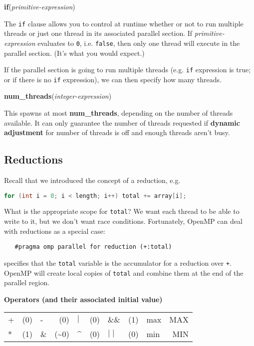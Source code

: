   \begin{center}
    {\bf if}({\it primitive-expression})    
  \end{center}
The {\tt if} clause allows you to control at runtime whether or not to run
multiple threads or just one thread in its associated parallel section.
If {\it primitive-expression} evaluates to {\tt 0}, i.e. {\tt false}, then
only one thread will execute in the parallel section. (It's what you would expect.)


If the parallel section is going to run multiple threads (e.g. {\tt if} expression
is true; or if there is no {\tt if} expression), we can then specify how many threads.
  \begin{center}
    {\bf num\_threads}({\it integer-expression})    
  \end{center}

This spawns at most {\bf num\_threads}, depending on the number of
threads available.  It can only guarantee the number of threads
requested if {\bf dynamic adjustment} for number of threads is off and
enough threads aren't busy.

\subsection*{Reductions}
Recall that we introduced the concept of a reduction, e.g.
{\small
\begin{lstlisting}[language=C,morekeywords={foreach,pragma,omp,parallel,single,nowait,task,untied,barrier,taskyield}]
  for (int i = 0; i < length; i++) total += array[i];
\end{lstlisting}
}
What is the appropriate scope for {\tt total}? We want each thread
to be able to write to it, but we don't want race conditions.
Fortunately, OpenMP can deal with reductions as a special case:

\verb!   #pragma omp parallel for reduction (+:total)!

\noindent
specifies that the {\tt total} variable is the accumulator for a
reduction over {\tt +}. OpenMP will create local copies of {\tt total} and 
combine them at the end of the parallel region.

{\bf Operators (and their associated initial value)}
  \begin{center}
    \begin{tabular}{l r | l r | l r | l r | l r}
      + & (0) & -  &  (0) &    $\mid$ & (0) & \&\& & (1) & max & MAX\\
      * & (1) & \& & (\~{}0) & \^{} & (0) &   $\mid\mid$ & (0) & min & MIN\\ 
    \end{tabular}
  \end{center}

